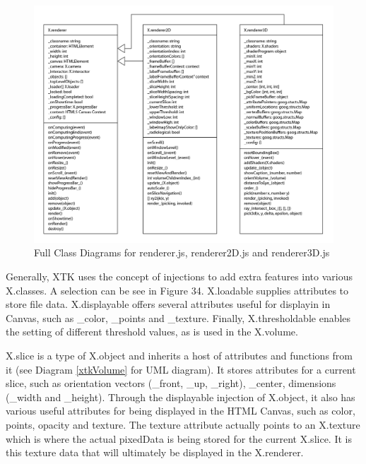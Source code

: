 \documentclass[a4paper,11pt,twoside]{article}
\begin{document}
\begin{figure}[ht!]
\centering
\includegraphics[width=170mm]{graphics/xtkUML_01.png}
\caption{Full Class Diagrams for renderer.js, renderer2D.js and renderer3D.js}
\label{fig:UIdesign1}
\end{figure}


Generally, XTK uses the concept of injections to add extra features into various X.classes. A selection can be see in Figure 34. X.loadable supplies attributes to store file data. X.displayable offers several attributes useful for displayin in Canvas, such as \_color, \_points and \_texture. Finally, X.thresholdable enables the setting of different threshold values, as is used in the X.volume.

X.slice is a type of X.object and inherits a host of attributes and functions from it (see Diagram \ref{xtkVolume} for UML diagram). It stores attributes for a current slice, such as orientation vectors (\_front, \_up, \_right), \_center, dimensions (\_width and \_height). Through the displayable injection of X.object, it also has various useful attributes for being displayed in the HTML Canvas, such as color, points, opacity and texture. The texture attribute actually points to an X.texture which is where the actual pixedData is being stored for the current X.slice. It is this texture data that will ultimately be displayed in the X.renderer.
\end{document}
